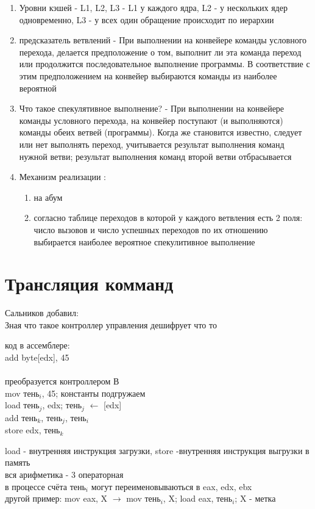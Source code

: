 \documentclass[a4paper,10pt]{article}
\begin{document}
\begin{enumerate}
    \item Уровни кэшей - L1, L2, L3 - L1 у каждого ядра, L2 - у нескольких ядер одновременно, L3 - у всех один обращение происходит по иерархии
    \item предсказатель ветвлений -  При выполнении на конвейере команды условного перехода,
    делается предположение о том, выполнит ли эта команда переход или продолжится
    последовательное выполнение программы. В соответствие с этим предположением на конвейер
    выбираются команды из наиболее вероятной
    \item Что такое спекулятивное выполнение? - При выполнении на конвейере команды условного
    перехода, на конвейер поступают (и выполняются) команды обеих ветвей (программы). Когда же
    становится известно, следует или нет выполнять переход, учитывается результат выполнения
    команд нужной ветви; результат выполнения команд второй ветви отбрасывается
    \item Механизм реализации :
    \begin{enumerate}
        \item на абум
        \item согласно таблице переходов в которой у каждого ветвления есть 2 поля: число вызовов и число успешных переходов по их отношению выбирается наиболее вероятное спекулитивное выполнение
    \end{enumerate}
\end{enumerate}
\section*{Трансляция комманд}
Сальников добавил: \\
Зная что такое контроллер управления дешифрует что то
\begin{multicols}{2}
\noindent
код в ассемблере: \\
add byte[edx], 45 \\
\columnbreak \\
преобразуется контроллером В \\
mov тень$_i$, 45; константы подгружаем \\
load тень$_j$, edx; тень$_j$ $\leftarrow$ [edx] \\
add тень$_k$, тень$_j$, тень$_i$ \\
store edx, тень$_k$ 
\end{multicols}
load - внутренняя инструкция загрузки, store -внутренняя инструкция выгрузки в память\\
вся арифметика - 3 операторная \\ в процессе  счёта тень$_i$ могут переименовываються в eax, edx, ebx \\
другой пример: mov eax, X $\rightarrow$ mov тень$_i$, X; load eax, тень$_i$; X - метка \\
\end{document}
